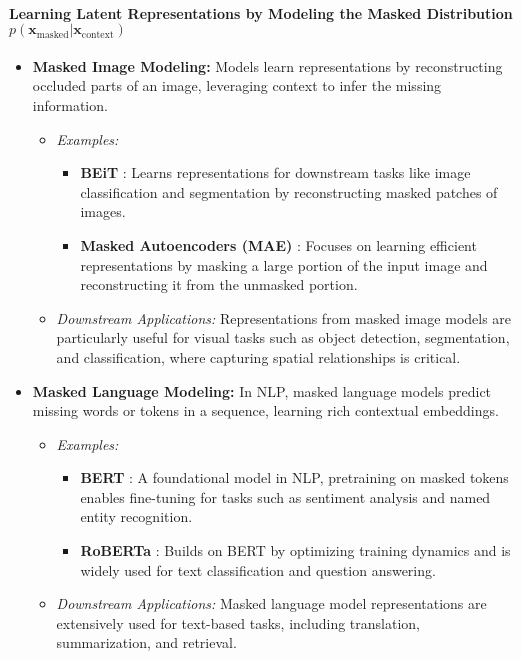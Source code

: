\paragraph{Learning Latent Representations by Modeling the Masked Distribution $p(\mathbf{x}_{\text{masked}}|\textbf{x}_{\text{context}})$}

\begin{itemize}
    \item \textbf{Masked Image Modeling:}
    Models learn representations by reconstructing occluded parts of an image, leveraging context to infer the missing information.
    \begin{itemize}
        \item \emph{Examples:}
        \begin{itemize}
            \item \textbf{BEiT} \citep{bao2021beit}: Learns representations for downstream tasks like image classification and segmentation by reconstructing masked patches of images.
            \item \textbf{Masked Autoencoders (MAE)} \citep{he2022masked}: Focuses on learning efficient representations by masking a large portion of the input image and reconstructing it from the unmasked portion.
        \end{itemize}
        \item \emph{Downstream Applications:}
        Representations from masked image models are particularly useful for visual tasks such as object detection, segmentation, and classification, where capturing spatial relationships is critical.
    \end{itemize}

    \item \textbf{Masked Language Modeling:}
    In NLP, masked language models predict missing words or tokens in a sequence, learning rich contextual embeddings.
    \begin{itemize}
        \item \emph{Examples:}
        \begin{itemize}
            \item \textbf{BERT} \citep{devlin2019bert}: A foundational model in NLP, pretraining on masked tokens enables fine-tuning for tasks such as sentiment analysis and named entity recognition.
            \item \textbf{RoBERTa} \citep{liu2019roberta}: Builds on BERT by optimizing training dynamics and is widely used for text classification and question answering.
        \end{itemize}
        \item \emph{Downstream Applications:}
        Masked language model representations are extensively used for text-based tasks, including translation, summarization, and retrieval.
    \end{itemize}
\end{itemize}

